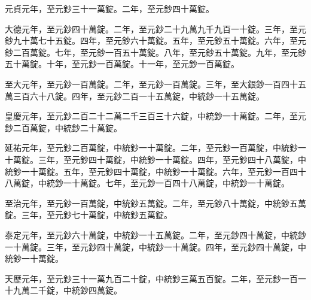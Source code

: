 \begin{pinyinscope}
 元貞元年，至元鈔三十一萬錠。二年，至元鈔四十萬錠。



 大德元年，至元鈔四十萬錠。二年，至元鈔二十九萬九千九百一十錠。三年，至元鈔九十萬七十五錠。四年，至元鈔六十萬錠。五年，至元鈔五十萬錠。六年，至元鈔二百萬錠。七年，至元鈔一百五十萬錠。八年，至元鈔五十萬錠。九年，至元鈔五十萬錠。十年，至元鈔一百萬錠。十一年，至元鈔一百萬錠。



 至大元年，至元鈔一百萬錠。二年，至元鈔一百萬錠。三年，至大銀鈔一百四十五萬三百六十八錠。四年，至元鈔二百一十五萬錠，中統鈔一十五萬錠。



 皇慶元年，至元鈔二百二十二萬二千三百三十六錠，中統鈔一十萬錠。二年，至元鈔二百萬錠，中統鈔二十萬錠。



 延祐元年，至元鈔二百萬錠，中統鈔一十萬錠。二年，至元鈔一百萬錠，中統鈔一十萬錠。三年，至元鈔四十萬錠，中統鈔一十萬錠。四年，至元鈔四十八萬錠，中統鈔一十萬錠。五年，至元鈔四十萬錠，中統鈔一十萬錠。六年，至元鈔一百四十八萬錠，中統鈔一十萬錠。七年，至元鈔一百四十八萬錠，中統鈔一十萬錠。



 至治元年，至元鈔一百萬錠，中統鈔五萬錠。二年，至元鈔八十萬錠，中統鈔五萬錠。三年，至元鈔七十萬錠，中統鈔五萬錠。



 泰定元年，至元鈔六十萬錠，中統鈔一十五萬錠。二年，至元鈔四十萬錠，中統鈔一十萬錠。三年，至元鈔四十萬錠，中統鈔一十萬錠。四年，至元鈔四十萬錠，中統鈔一十萬錠。



 天歷元年，至元鈔三十一萬九百二十錠，中統鈔三萬五百錠。二年，至元鈔一百一十九萬二千錠，中統鈔四萬錠。



\end{pinyinscope}